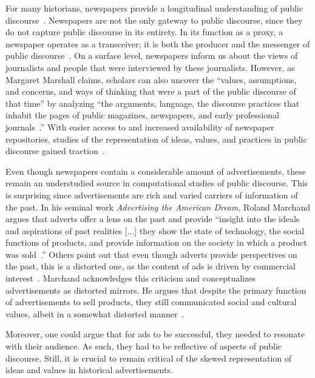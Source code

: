 \documentclass[USenglish]{article}
\begin{document}
For many historians, newspapers provide a longitudinal understanding of public discourse~\cite{postman_amusing_2005,vree_nederlandse_1989}. Newspapers are not the only gateway to public discourse, since they do not capture public discourse in its entirety. In its function as a proxy, a newspaper operates as a transceiver; it is both the producer and the messenger of public discourse~\cite[17-18]{schudson_power_1982}. On a surface level, newspapers inform us about the views of journalists and people that were interviewed by these journalists. However, as Margaret Marshall claims, scholars can also uncover the ``values, assumptions, and concerns, and ways of thinking that were a part of the public discourse of that time'' by analyzing ``the arguments, language, the discourse practices that inhabit the pages of public magazines, newspapers, and early professional journals~\cite[8]{marshall_contesting_1995}.'' With easier access to and increased availability of newspaper repositories, studies of the representation of ideas, values, and practices in public discourse gained traction~\cite{van_eijnatten_eurocentric_2019,daems_workers_2019}. 

Even though newspapers contain a considerable amount of advertisements, these remain an understudied source in computational studies of public discourse. This is surprising since advertisements are rich and varied carriers of information of the past. In his seminal work \textit{Advertising the American Dream}, Roland Marchand argues that adverts offer a lens on the past and provide ``insight into the ideals and aspirations of past realities [...] they show the state of technology, the social functions of products, and provide information on the society in which a product was sold~\cite{marchand_advertising_1985}.'' Others point out that even though adverts provide perspectives on the past, this is a distorted one, as the content of ads is driven by commercial interest~\cite{fox_mirror_1997}. 
%
Marchand acknowledges this criticism and conceptualizes advertisements as distorted mirrors. He argues that despite the primary function of advertisements to sell products, they still communicated social and cultural values, albeit in a somewhat distorted manner~\cite{marchand_advertising_1985,lears_fables_1994}. 

Moreover, one could argue that for ads to be successful, they needed to resonate with their audience. As such, they had to be reflective of aspects of public discourse. Still, it is crucial to remain critical of the skewed representation of ideas and values in historical advertisements. 
\end{document}

